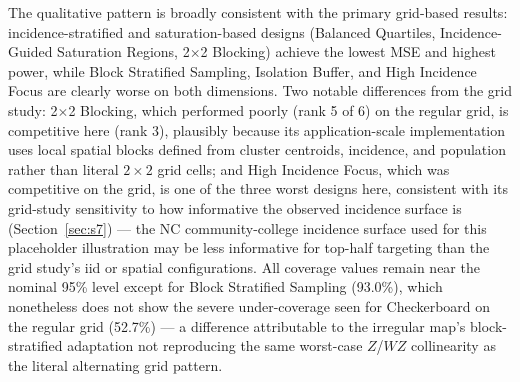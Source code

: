 \documentclass[11pt]{article}
\begin{document}
The qualitative pattern is broadly consistent with the primary grid-based
results: incidence-stratified and saturation-based designs (Balanced
Quartiles, Incidence-Guided Saturation Regions, 2$\times$2 Blocking) achieve
the lowest MSE and highest power, while Block Stratified Sampling, Isolation
Buffer, and High Incidence Focus are clearly worse on both dimensions. Two
notable differences from the grid study: 2$\times$2 Blocking, which performed
poorly (rank 5 of 6) on the regular grid, is competitive here (rank 3),
plausibly because its application-scale implementation uses local spatial
blocks defined from cluster centroids, incidence, and population rather than
literal $2\times2$ grid cells; and High Incidence Focus, which was competitive
on the grid, is one of the three worst designs here, consistent with its
grid-study sensitivity to how informative the observed incidence surface is
(Section~\ref{sec:s7}) --- the NC community-college incidence surface used for
this placeholder illustration may be less informative for top-half targeting
than the grid study's iid or spatial configurations. All coverage values
remain near the nominal 95\% level except for Block Stratified Sampling
(93.0\%), which nonetheless does not show the severe under-coverage seen for
Checkerboard on the regular grid (52.7\%) --- a difference attributable to the
irregular map's block-stratified adaptation not reproducing the same
worst-case $Z$/$WZ$ collinearity as the literal alternating grid pattern.
\end{document}
